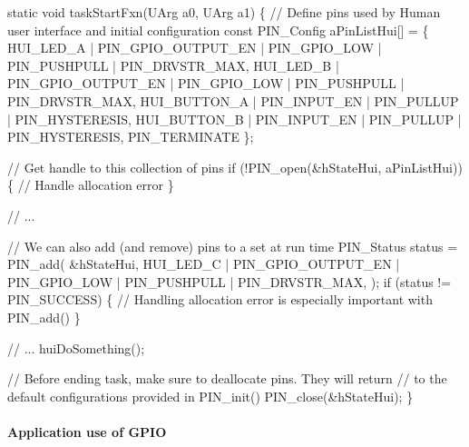 \begin{DoxyCode}
\textcolor{keyword}{static} \textcolor{keywordtype}{void} taskStartFxn(UArg a0, UArg a1) \{
    \textcolor{comment}{// Define pins used by Human user interface and initial configuration}
    \textcolor{keyword}{const} PIN_Config aPinListHui[] = \{
        HUI\_LED\_A    | PIN_GPIO_OUTPUT_EN | PIN_GPIO_LOW | PIN_PUSHPULL | 
      PIN_DRVSTR_MAX,
        HUI\_LED\_B    | PIN_GPIO_OUTPUT_EN | PIN_GPIO_LOW | PIN_PUSHPULL | 
      PIN_DRVSTR_MAX,
        HUI\_BUTTON\_A | PIN_INPUT_EN  | PIN_PULLUP | PIN_HYSTERESIS,
        HUI\_BUTTON\_B | PIN_INPUT_EN  | PIN_PULLUP | PIN_HYSTERESIS,
        PIN_TERMINATE
    \};

    \textcolor{comment}{// Get handle to this collection of pins}
    \textcolor{keywordflow}{if} (!PIN_open(&hStateHui, aPinListHui)) \{
        \textcolor{comment}{// Handle allocation error}
    \}

    \textcolor{comment}{// ...}

    \textcolor{comment}{// We can also add (and remove) pins to a set at run time}
    PIN_Status status = PIN_add(
      &hStateHui,
      HUI\_LED\_C | PIN_GPIO_OUTPUT_EN | PIN_GPIO_LOW | PIN_PUSHPULL | 
      PIN_DRVSTR_MAX,
    );
    \textcolor{keywordflow}{if} (status != PIN_SUCCESS) \{
        \textcolor{comment}{// Handling allocation error is especially important with PIN\_add()}
    \}

    \textcolor{comment}{// ...}
    huiDoSomething();

    \textcolor{comment}{// Before ending task, make sure to deallocate pins. They will return}
    \textcolor{comment}{// to the default configurations provided in PIN\_init()}
    PIN_close(&hStateHui);
\}
\end{DoxyCode}


\paragraph*{Application use of G\+P\+I\+O}


